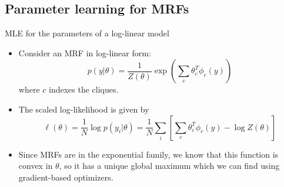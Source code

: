 \documentclass[10pt,mathserif]{beamer}
\begin{document}

\subsection{Parameter learning for MRFs}
\begin{frame}{MLE for the parameters of a log-linear model}
\begin{itemize}
    \item Consider an MRF in log-linear form:
    \begin{equation}
        p(y|\theta) = \frac{1}{Z(\theta)}\exp(\sum_c \theta_c^T \phi_c(y))
    \end{equation}
    where $c$ indexes the cliques.
    \item The scaled log-likelihood is given by
    \begin{equation}
        \ell(\theta) = \frac{1}{N}\log p(y_i|\theta) = \frac{1}{N} \sum_i[\sum_c \theta_c^T \phi_c(y) - \log Z(\theta)]
    \end{equation}
    \item Since MRFs are in the exponential family, we know that this function is convex in $\theta$, so it has a unique global maximum which we can find using gradient-based optimizers.
\end{itemize}
\end{frame}
\end{document}
